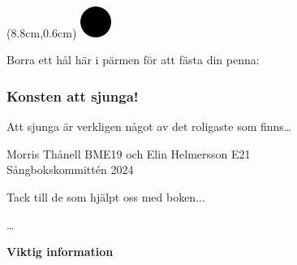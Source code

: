 
\begin{textblock*}{3cm}(8.8cm,0.6cm) %
   \includegraphics[width=1.0cm]{./bilder/cirkel.png}
\end{textblock*}

\vspace*{-8mm}
Borra ett hål här i pärmen för att fästa din penna: %

\subsubsection*{Konsten att sjunga!}
Att sjunga är verkligen något av det roligaste som finns\dots

Morris Thånell BME19 och Elin Helmersson E21\\
Sångbokskommittén 2024



\newpage

Tack till de som hjälpt oss med boken...

\dots

\newpage






\vspace*{-13mm} %
\enlargethispage{15mm} %




\begin{center}
    \textbf{Viktig information}
\end{center}


